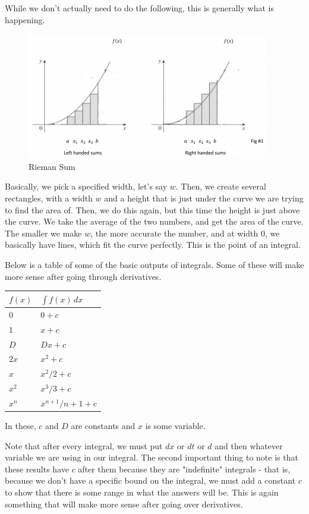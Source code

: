 \documentclass[12pt]{article}
\begin{document}
While we don't actually need to do the following, this is generally what is happening. 

\begin{centering}
\begin{figure}[H]
\caption{Rieman Sum}
\includegraphics[scale=0.8]{rieman.jpg}
\end{figure}
\end{centering}

Basically, we pick a specified width, let's say $w$. 
Then, we create several rectangles, with a width $w$ and a height that is just under the curve we are trying to find the area of. 
Then, we do this again, but this time the height is just above the curve. 
We take the average of the two numbers, and get the area of the curve. 
The smaller we make $w$, the more accurate the number, and at width $0$, we basically have lines, which fit the curve perfectly. 
This is the point of an integral.

Below is a table of some of the basic outputs of integrals. Some of these will make more sense after going through derivatives.

\begin{tabular}{l|l}
    $f(x)$ & $\int f(x) \, dx$\\
    \hline
     $0$ & $0+c$ \\
     $1$ & $x+c$ \\
     $D$ & $Dx+c$ \\
     $2x$ & $x^2 + c$ \\
     $x$ & $x^2/2 + c$ \\
     $x^2$ & $x^3/3 + c$ \\
     $x^n$ & $x^{n+1}/n+1 + c$
\end{tabular}

In these, $c$ and $D$ are constants and $x$ is some variable.

Note that after every integral, we must put $dx$ or $dt$ or $d$ and then whatever variable we are using in our integral. 
The second important thing to note is that these results have $c$ after them because they are "indefinite" integrals - that is, because we don't have a specific bound on the integral, we must add a constant $c$ to show that there is some range in what the answers will be. 
This is again something that will make more sense after going over derivatives.
\end{document}
